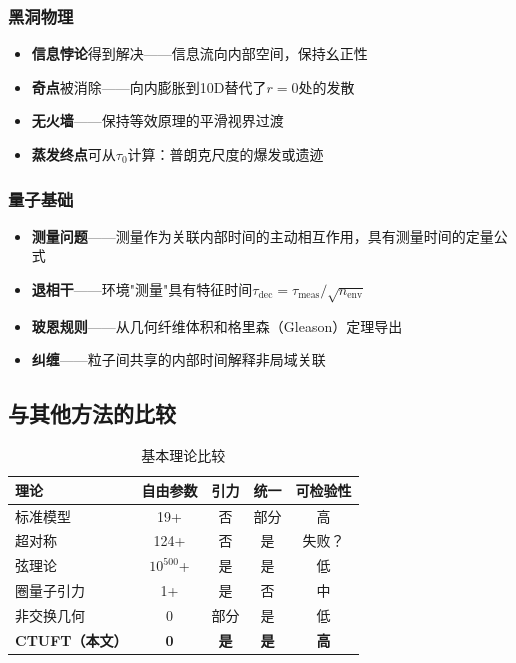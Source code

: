 \subsubsection{黑洞物理}

\begin{itemize}
    \item \textbf{信息悖论}得到解决——信息流向内部空间，保持幺正性
    \item \textbf{奇点}被消除——向内膨胀到10D替代了$r=0$处的发散
    \item \textbf{无火墙}——保持等效原理的平滑视界过渡
    \item \textbf{蒸发终点}可从$\tau_0$计算：普朗克尺度的爆发或遗迹
\end{itemize}

\subsubsection{量子基础}

\begin{itemize}
    \item \textbf{测量问题}——测量作为关联内部时间的主动相互作用，具有测量时间的定量公式
    \item \textbf{退相干}——环境"测量"具有特征时间$\tau_{\text{dec}} = \tau_{\text{meas}}/\sqrt{n_{\text{env}}}$
    \item \textbf{玻恩规则}——从几何纤维体积和格里森（Gleason）定理导出
    \item \textbf{纠缠}——粒子间共享的内部时间解释非局域关联
\end{itemize}

\subsection{与其他方法的比较}

\begin{table}[htbp]
\centering
\caption{基本理论比较}
\begin{tabular}{@{}lcccc@{}}
\hline
\textbf{理论} & \textbf{自由参数} & \textbf{引力} & \textbf{统一} & \textbf{可检验性} \\
\hline
标准模型 & 19+ & 否 & 部分 & 高 \\
超对称 & 124+ & 否 & 是 & 失败？ \\
弦理论 & $10^{500}$+ & 是 & 是 & 低 \\
圈量子引力 & 1+ & 是 & 否 & 中 \\
非交换几何 & 0 & 部分 & 是 & 低 \\
\textbf{CTUFT（本文）} & \textbf{0} & \textbf{是} & \textbf{是} & \textbf{高} \\
\hline
\end{tabular}
\end{table}

